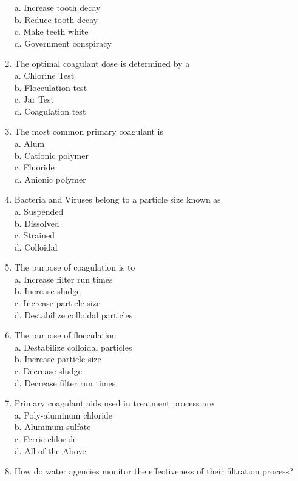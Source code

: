 \begin{enumerate}
a. Increase tooth decay\\
b. Reduce tooth decay\\
c. Make teeth white\\
d. Government conspiracy\\
\item The optimal coagulant dose is determined by a\\
a. Chlorine Test\\
b. Flocculation test\\
c. Jar Test\\
d. Coagulation test\\
\item The most common primary coagulant is\\
a. Alum\\
b. Cationic polymer\\
c. Fluoride\\
d. Anionic polymer\\
\item Bacteria and Viruses belong to a particle size known as\\
a. Suspended\\
b. Dissolved\\
c. Strained\\
d. Colloidal\\
\item The purpose of coagulation is to\\
a. Increase filter run times\\
b. Increase sludge\\
c. Increase particle size\\
d. Destabilize colloidal particles\\
\item The purpose of flocculation\\
a. Destabilize colloidal particles\\
b. Increase particle size\\
c. Decrease sludge\\
d. Decrease filter run times\\
\item Primary coagulant aids used in treatment process are\\
a. Poly-aluminum chloride\\
b. Aluminum sulfate\\
c. Ferric chloride\\
d. All of the Above\\
\item How do water agencies monitor the effectiveness of their filtration process?\\

\end{enumerate}
